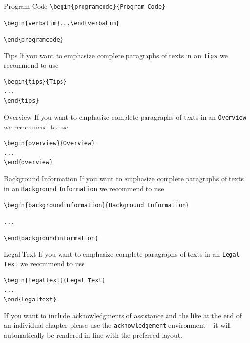 \documentclass[graybox]{svmult}
\begin{document}
{\begin{programcode}{Program Code}
\verb|\begin{programcode}{Program Code}|

\verb|\begin{verbatim}...\end{verbatim}|

\verb|\end{programcode}|

\end{programcode}
%
\begin{tips}{Tips}
If you want to emphasize complete paragraphs of texts in an \verb|Tips| we recommend to
use  \begin{verbatim}\begin{tips}{Tips}
...
\end{tips}\end{verbatim}
\end{tips}
\eject
%
\begin{overview}{Overview}
If you want to emphasize complete paragraphs of texts in an \verb|Overview| we recommend to
use  \begin{verbatim}\begin{overview}{Overview}
...
\end{overview}\end{verbatim}
\end{overview}
\begin{backgroundinformation}{Background Information}
If you want to emphasize complete paragraphs of texts in an \verb|Background|
\verb|Information| we recommend to
use

\verb|\begin{backgroundinformation}{Background Information}|

\verb|...|

\verb|\end{backgroundinformation}|
\end{backgroundinformation}
\begin{legaltext}{Legal Text}
If you want to emphasize complete paragraphs of texts in an \verb|Legal Text| we recommend to
use  \begin{verbatim}\begin{legaltext}{Legal Text}
...
\end{legaltext}\end{verbatim}
\end{legaltext}
%
\begin{acknowledgement}
If you want to include acknowledgments of assistance and the like at the end of an individual chapter please use the \verb|acknowledgement| environment -- it will automatically be rendered in line with the preferred layout.
\end{acknowledgement}
%
}
\end{document}
